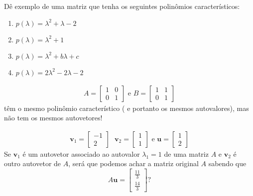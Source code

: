 \documentclass{beamer}
\begin{document}
\begin{frame}{4}
  Dê exemplo de uma matriz que tenha os seguintes polinômios característicos:
  \begin{enumerate}
    \item $p(\lambda) = \lambda^2 + \lambda -2$
    \item $p(\lambda) = \lambda^2 + 1$
    \item $p(\lambda) = \lambda^2 + b\lambda + c$
    \item $p(\lambda) = 2\lambda^2 -2\lambda -2$
  \end{enumerate}
  
\end{frame}

\begin{frame}{5}
  \begin{gather*}
    A= \begin{bmatrix}
      1 & 0 \\ 0 & 1
    \end{bmatrix} \text{ e } B= \begin{bmatrix}
      1 & 1 \\ 0 & 1 
    \end{bmatrix}
  \end{gather*}
  têm o mesmo polinômio característico ( e portanto os mesmos autovalores), mas não tem os mesmos autovetores!
\end{frame}

\begin{frame}{6}
  \begin{gather*}
    \mathbf{v}_1 = \begin{bmatrix}
      -1 \\ 2
    \end{bmatrix}\text{ }\mathbf{v}_2 = \begin{bmatrix}
      1 \\ 1
    \end{bmatrix} \text{ e } \mathbf{u}=\begin{bmatrix}
      1 \\ 2
    \end{bmatrix}
  \end{gather*}
  Se $\mathbf{v}_1$ é um autovetor associado ao autovalor $\lambda_1=1$ de uma matriz $A$ e $\mathbf{v}_2$ é outro
  autovetor de $A$, será que podemos achar a matriz original $A$ sabendo que 
  $$ A\mathbf{u}=\begin{bmatrix} \frac{11}{3}\\
    \frac{14}{3}
    \end{bmatrix} ?$$
\end{frame}
\end{document}

